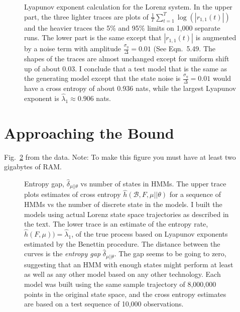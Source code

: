 \documentclass[prelim,showlabels]{book}
\newcommand{\ti}[2]{{#1}{(#2)}}                  %
\newcommand{\plotsize}{\small}
\begin{document}
\begin{figure}[htb]
  \centering{\plotsize%
    \def\NFp{95\%}%
    \def\SamOne{Sample1}%
    \def\SamTwo{Sample2}%
    \def\SamThr{Sample3}%
    \def\Fp{5\%}%
    \def\ylabel{$\hat\lambda(t)$}%
    \def\t{$t$}%
%    
  }
  \caption[Lyapunov exponent calculation for
  the Lorenz system.]%
  {Lyapunov exponent calculation for the Lorenz system.  In the upper
    part, the three lighter traces are plots of $\frac{1}{T}
    \sum_{t=1}^T \log\left( \left| \ti{r_{1,1}}{t} \right| \right)$
    and the heavier traces the 5\% and 95\% limits on 1,000 separate
    runs.  The lower part is the same except that $\left|
      \ti{r_{1,1}}{t} \right|$ is augmented by a noise term with
    amplitude $\frac{\sigma_\eta}{\Delta} = 0.01$ (See
    Eqn.~5.49.  The shapes of the traces are almost
    unchanged except for uniform shift up of about 0.03.  I conclude
    that a test model that is the same as the generating model except
    that the state noise is $\frac{\sigma_\eta}{\Delta} = 0.01$ would
    have a cross entropy of about 0.936 nats, while the largest Lyapunov
    exponent is $\hat \lambda_1 \approx 0.906$ nats.}
  \label{fig:benettin}
\end{figure}

\addtocounter{section}{1}
\section{Approaching the Bound}
\label{sec:approach}

Fig.~\ref{fig:LikeLor} from the data.  Note: To make this figure you
must have at least two gigabytes of RAM.
\begin{figure}[htbp]
  \caption[Entropy gap, $\hat
  \delta_{\mu||\theta}$ vs number of states in HMMs]%
  {Entropy gap, $\hat \delta_{\mu||\theta}$ vs number of states in
    HMMs.  The upper trace plots estimates of cross entropy $\hat
    h(\mathcal{B},F,\mu||\theta)$ for a sequence of HMMs vs the number
    of discrete state in the models.  I built the models using actual
    Lorenz state space trajectories as described in the text.  The
    lower trace is an estimate of the entropy rate, $\hat h(F,\mu)) =
    \hat \lambda_1$, of the true process based on Lyapunov exponents
    estimated by the Benettin procedure.  The distance between the
    curves is the \emph{entropy gap} $\hat \delta_{\mu||\theta}$. The
    gap seems to be going to zero, suggesting that an HMM with enough
    states might perform at least as well as any other model based on
    any other technology.  Each model was built using the same sample
    trajectory of 8,000,000 points in the original state space, and
    the cross entropy estimates are based on a test sequence of 10,000
    observations.}
  \label{fig:LikeLor}
\end{figure}
\end{document}
